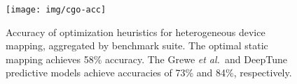 \begin{figure}
  \centering %
  \texttt{[image: img/cgo-acc]}%
  \caption{%
  Accuracy of optimization heuristics for heterogeneous device mapping,
  aggregated by benchmark suite. The optimal static mapping achieves 58\%
  accuracy. The Grewe \emph{et al.\ }and DeepTune predictive models achieve
  accuracies of 73\% and 84\%, respectively.%
  }
  \label{fig:cgo-accuracy}
\end{figure}
